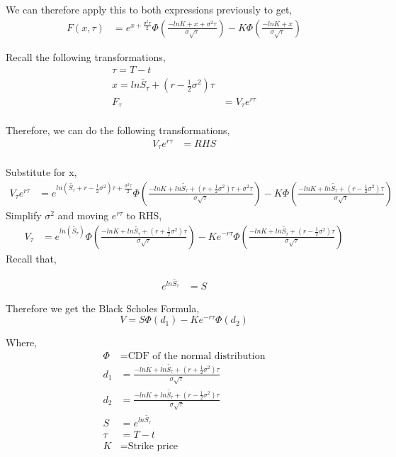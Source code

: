 \documentclass[12pt]{article}
\begin{document}
We can therefore apply this to both expressions previously to get,
\begin{align*}
F(x, \tau) &= e^{x+\frac{\sigma ^2 \tau}{2}}\Phi\left(\frac{-ln{K}+x+\sigma ^2 \tau}{\sigma\sqrt{\tau}}\right)-K\Phi\left(\frac{-ln{K}+x}{\sigma\sqrt{\tau}}\right)
\end{align*}

Recall the following transformations,
\begin{align*}
\tau = T - t \\
x = ln{\tilde{S_{\tau}}}+ \left(r - \frac{1}{2}\sigma^2\right)\tau \\
F_{\tau} &= V_{\tau}e^{r\tau} \\
\end{align*}

Therefore, we can do the following transformations,
\begin{align*}
V_{\tau}e^{r\tau} &= RHS \\
\end{align*}

Substitute for x,
\begin{align*}
V_{\tau}e^{r\tau} &= e^{ln({\tilde{S_{\tau}}+ r - \frac{1}{2}\sigma ^2})\tau+ \frac{\sigma ^2 \tau}{2}}\Phi \left(\frac{-ln{K} + ln\tilde{S_{\tau}}+ \left(r + \frac{1}{2}\sigma ^2\right)\tau + \sigma ^2 \tau}{\sigma\sqrt{\tau}}\right)-K\Phi\left(\frac{-ln{K}+ln{\tilde{S_{\tau}}}+\left(r - \frac{1}{2}\sigma ^2\right)\tau}{\sigma \sqrt{\tau}}\right)
\end{align*}
Simplify $\sigma ^2$ and moving $e^ {r\tau}$ to RHS,
\begin{align*}
V_{\tau} &= e^{ln(\tilde{S_{\tau}})}\Phi \left(\frac{-ln{K} + ln\tilde{S_{\tau}}+ \left(r + \frac{1}{2}\sigma ^2\right)\tau}{\sigma\sqrt{\tau}}\right)-Ke^{-r\tau}\Phi\left(\frac{-ln{K}+ln{\tilde{S_{\tau}}}+\left(r - \frac{1}{2}\sigma ^2\right)\tau}{\sigma \sqrt{\tau}}\right)
\end{align*}
Recall that,

\begin{align*}
e^{ln\tilde{S_{\tau}}} &= S
\end{align*}

Therefore we get the Black Scholes Formula,
\begin{equation}
V = S\Phi(d_{1}) - Ke^{-r\tau}\Phi(d_{2})
\end{equation}

Where,
\begin{align*}
\Phi &= \text{CDF of the normal distribution} \\
d_{1} &= \frac{-ln{K} + ln\tilde{S_{\tau}}+ \left(r + \frac{1}{2}\sigma ^2\right)\tau}{\sigma\sqrt{\tau}} \\
d_{2} &= \frac{-ln{K}+ln{\tilde{S_{\tau}}}+\left(r - \frac{1}{2}\sigma ^2\right)\tau}{\sigma \sqrt{\tau}} \\
S & = e^{ln{\tilde{S_{\tau}}}} \\
\tau &= T - t \\
K &= \text{Strike price} \\
\end{align*}
\end{document}
